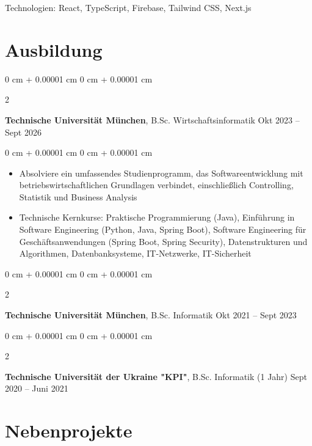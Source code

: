 \documentclass[10pt, letterpaper]{article}
\newenvironment{highlights}{
    \begin{itemize}[
        topsep=0.10 cm,
        parsep=0.10 cm,
        partopsep=0pt,
        itemsep=0pt,
        leftmargin=0 cm + 10pt
    ]
}{
    \end{itemize}
} %
\newenvironment{onecolentry}{
    \begin{adjustwidth}{
        0 cm + 0.00001 cm
    }{
        0 cm + 0.00001 cm
    }
}{
    \end{adjustwidth}
} %
\newenvironment{twocolentry}[2][]{
    \onecolentry
    \def\secondColumn{#2}
    \setcolumnwidth{\fill, 4.5 cm}
    \begin{paracol}{2}
}{
    \switchcolumn \raggedleft \secondColumn
    \end{paracol}
    \endonecolentry
} %
\begin{document}
    \vspace{0.20 cm}
    Technologien: React, TypeScript, Firebase, Tailwind CSS, Next.js

    \section{Ausbildung}

        \begin{twocolentry}{
            Okt 2023 – Sept 2026
        }
            \textbf{Technische Universität München}, B.Sc. Wirtschaftsinformatik\end{twocolentry}

        \vspace{0.10 cm}
        \begin{onecolentry}
            \begin{highlights}
                \item Absolviere ein umfassendes Studienprogramm, das Softwareentwicklung mit betriebswirtschaftlichen Grundlagen verbindet, einschließlich Controlling, Statistik und Business Analysis
                \item Technische Kernkurse: Praktische Programmierung (Java), Einführung in Software Engineering (Python, Java, Spring Boot), Software Engineering für Geschäftsanwendungen (Spring Boot, Spring Security), Datenstrukturen und Algorithmen, Datenbanksysteme, IT-Netzwerke, IT-Sicherheit
            \end{highlights}
        \end{onecolentry}

        \vspace{0.20 cm}

        \begin{twocolentry}{
            Okt 2021 – Sept 2023
        }
            \textbf{Technische Universität München}, B.Sc. Informatik\end{twocolentry}
        
        \vspace{0.20 cm}

        \begin{twocolentry}{
            Sept 2020 – Juni 2021
        }
            \textbf{Technische Universität der Ukraine "KPI"}, B.Sc. Informatik (1 Jahr)\end{twocolentry}
    
    \section{Nebenprojekte}
        
\end{document}
